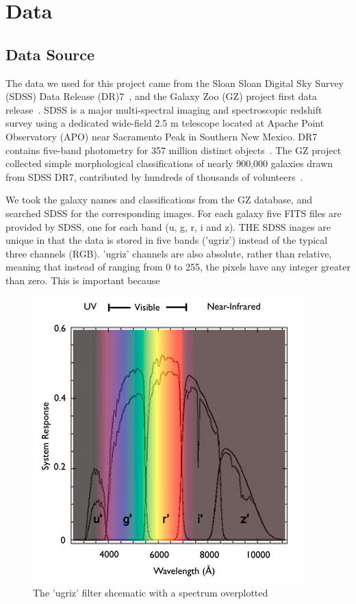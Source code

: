 \section{Data}
\label{sec:data}
\subsection{Data Source}
The data we used for this project came from the Sloan Sloan Digital Sky Survey (SDSS) Data Release (DR)7~\cite{abazajian2009seventh}, and the Galaxy Zoo (GZ) project first data release~\cite{lintott2010galaxy}. 
SDSS is a major multi-spectral imaging and spectroscopic redshift survey using a dedicated wide-field 2.5 m telescope located at Apache Point Observatory (APO) near Sacramento Peak in Southern New Mexico.
DR7 contains five-band photometry for 357 million distinct objects~\cite{abazajian2009seventh}. 
The GZ project collected simple morphological classifications of nearly 900,000 galaxies drawn from SDSS DR7, contributed by hundreds of thousands of volunteers~\cite{lintott2010galaxy}. 

We took the galaxy names and classifications from the GZ database, and searched SDSS for the corresponding images. For each galaxy five FITS files are provided by SDSS, one for each band (u, g, r, i and z). 
THE SDSS inages are unique in that the data is stored in five bands ('ugriz') instead of the typical three channels (RGB). 
'ugriz' channels are also absolute, rather than relative, meaning that instead of ranging from 0 to 255, the pixels have any integer greater than zero. 
This is important because 


\begin{figure}[h!]
	\centering
	\captionsetup{justification=centering}
	\includegraphics[scale=0.7]{Figures/filters.jpg}
	\caption{The 'ugriz' filter shcematic with a spectrum overplotted}
	\label{fig:filters}
\end{figure}



